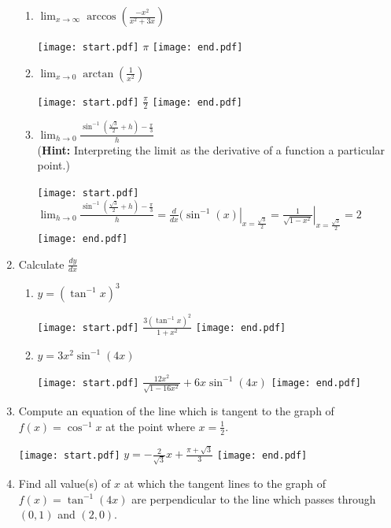 \documentclass[12pt]{article}
\begin{document}
\begin{enumerate}
\begin{enumerate}

\item $\displaystyle \lim_{x\rightarrow \infty}{\arccos{\left(\frac{-x^2}{x^2+3x}\right)}}$ 

\texttt{[image: start.pdf]}
{{$\displaystyle \pi$}}
\texttt{[image: end.pdf]}


\item $\displaystyle \lim_{x\rightarrow 0}{\arctan{\left(\frac{1}{x^2}\right)}}$ 

\texttt{[image: start.pdf]}
{{$\displaystyle \frac{\pi}{2}$}}
\texttt{[image: end.pdf]}


\item $\lim_{h \rightarrow 0}{\frac{\sin^{-1}{\left(\frac{\sqrt{3}}{2}+h\right)}-\frac{\pi}{3}}{h}}$ \\({\bf Hint:} Interpreting the limit as the derivative of a function a particular point.)

\texttt{[image: start.pdf]}
{{$\lim_{h \rightarrow 0}{\frac{\sin^{-1}{\left(\frac{\sqrt{3}}{2}+h\right)}-\frac{\pi}{3}}{h}}=\left.\frac{d}{dx}(\sin^{-1}{(x)}\right|_{x=\frac{\sqrt{3}}{2}}=\left.\frac{1}{\sqrt{1-x^2}}\right|_{x=\frac{\sqrt{3}}{2}}=2$}}
\texttt{[image: end.pdf]}


\end{enumerate}

\item Calculate $\frac{dy}{dx}$

\begin{enumerate}

\item $y=\left(\tan^{-1}x\right)^3$

\texttt{[image: start.pdf]}
{$\frac{3\left(\tan^{-1}x\right)^2}{1+x^2}$}
\texttt{[image: end.pdf]}


\item $y=3x^2\sin^{-1}(4x)$

\texttt{[image: start.pdf]}
{$\frac{12x^2}{\sqrt{1-16x^2}}+6x\sin^{-1}(4x)$}
\texttt{[image: end.pdf]}


\end{enumerate}

\item Compute an equation of the line which is tangent to the graph of $f(x)=\cos^{-1}{x}$ at the point where $x=\frac{1}{2}$.

\texttt{[image: start.pdf]}
{{$y=-\frac{2}{\sqrt{3}}x+\frac{\pi+\sqrt{3}}{3}$}}
\texttt{[image: end.pdf]}


\item Find all value(s) of $x$ at which the tangent lines to the graph of $f(x)=\tan^{-1}{(4x)}$ are perpendicular to the line which passes through $(0,1)$ and $(2,0)$.


\end{enumerate}
\end{document}
